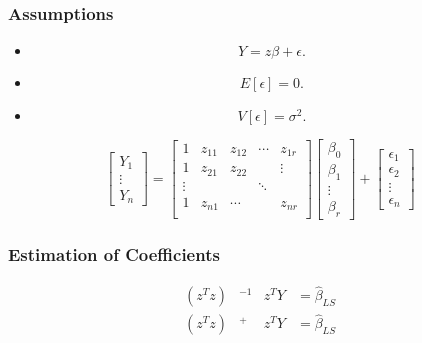 \documentclass[aspectratio=169,10pt,t]{beamer}
\begin{document}
\begin{frame}[t]
	\frametitle{Assumptions}

	\begin{itemize}
		\item 
			\[
			Y = z \beta + \epsilon
			.\] 
		\item 
			\[
				E  \left[ \epsilon  \right] = 0
			.\] 
		\item 
			\[
				V  \left[ \epsilon  \right] = \sigma^{2}
			.\] 
	\end{itemize}

	\[
		\begin{bmatrix}
			Y_1\\
			\vdots\\
			Y_{n}
		\end{bmatrix}
		=
		\begin{bmatrix}
			1 & z_{11} & z_{12} & \cdots & z_{1r}\\
			1 & z_{21} & z_{22} &  & \vdots\\
			\vdots & & & \ddots & \\
			1 & z_{n1} &   \cdots && z_{nr}\\
		\end{bmatrix}
		\begin{bmatrix}
			\beta_0\\
			\beta_1\\
			\vdots\\
			\beta_r
		\end{bmatrix}
		+
		\begin{bmatrix}
			\epsilon_1\\
			\epsilon_2\\
			\vdots\\
			\epsilon_n
		\end{bmatrix}
	\] 

\end{frame}

\begin{frame}[t]
	\frametitle{Estimation of Coefficients}
	\[
		\begin{aligned}
			\left( z^{T} z  \right)& ^{-1} &z^{T} Y &= \hat{\beta}_{LS}\\
			\left( z^{T} z  \right)& ^{+} &z^{T} Y &= \hat{\beta}_{LS}
		\end{aligned}
	\] 
\end{frame}
\end{document}
